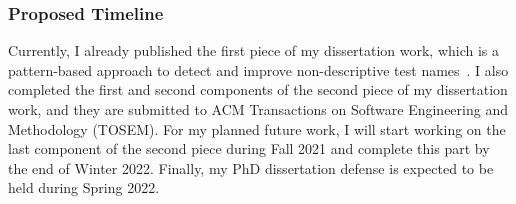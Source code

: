 \subsubsection{Proposed Timeline}

Currently, I already published the first piece of my dissertation work, which is a pattern-based approach to detect and improve non-descriptive test names~\cite{wu2020pattern}.
%
I also completed the first and second components of the second piece of my dissertation work, and they are submitted to ACM Transactions on Software Engineering and Methodology (TOSEM).
%
For my planned future work, I will start working on the last component of the second piece during Fall 2021 and complete this part by the end of Winter 2022.
%
Finally, my PhD dissertation defense is expected to be held during Spring 2022.